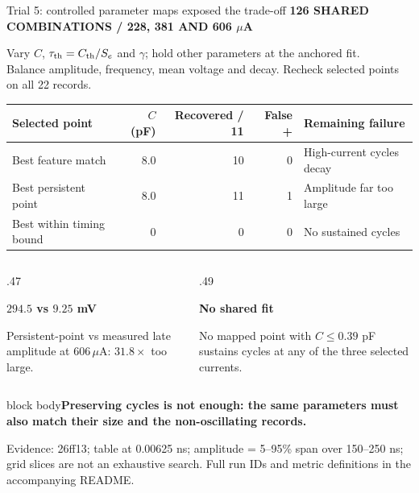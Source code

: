 \documentclass[aspectratio=169,11pt]{beamer}
\newcommand{\eyebrow}[1]{{\color{teal}\scriptsize\bfseries\MakeUppercase{#1}}\par\vspace{2mm}}
\newcommand{\takeaway}[1]{\par\vspace{2mm}\begin{beamercolorbox}[sep=2mm,wd=\linewidth]{block body}\small\bfseries #1\end{beamercolorbox}}
\newcommand{\src}[1]{\par\vfill{\fontsize{6.5}{8}\selectfont\color{muted}Evidence: #1. Full run IDs and metric definitions in the accompanying README.\par}}
\newcommand{\key}[2]{\par{\color{teal}\Large\bfseries #1}\par\small #2\par}
\begin{document}
\begin{frame}[t]{Trial 5: controlled parameter maps exposed the trade-off}
\eyebrow{126 shared combinations / 228, 381 and 606 $\mu$A}
\small Vary $C$, $\tau_{\rm th}=C_{\rm th}/S_e$ and $\gamma$; hold other parameters at the anchored fit.\\
Balance amplitude, frequency, mean voltage and decay. Recheck selected points on all 22 records.
\vspace{3mm}
\renewcommand{\arraystretch}{1.3}
\begin{tabular}{@{}p{4cm}rrrp{5.1cm}@{}}
\toprule
\textbf{Selected point} & \textbf{$C$ (pF)} & \textbf{Recovered / 11} & \textbf{False +} & \textbf{Remaining failure}\\\midrule
Best feature match & 8.0 & 10 & 0 & High-current cycles decay\\
Best persistent point & 8.0 & 11 & 1 & Amplitude far too large\\
Best within timing bound & 0 & 0 & 0 & No sustained cycles\\\bottomrule
\end{tabular}\par
\vspace{3mm}
\begin{columns}[T,onlytextwidth]
\begin{column}{.47\textwidth}
\key{$294.5$ vs $9.25$ mV}{Persistent-point vs measured late amplitude at $606\,\mu$A: $31.8\times$ too large.}
\end{column}
\begin{column}{.49\textwidth}
\key{No shared fit}{No mapped point with $C\leq0.39$ pF sustains cycles at any of the three selected currents.}
\end{column}
\end{columns}
\takeaway{Preserving cycles is not enough: the same parameters must also match their size and the non-oscillating records.}
\src{26ff13; table at 0.00625 ns; amplitude = 5--95\% span over 150--250 ns; grid slices are not an exhaustive search}
\end{frame}
\end{document}
